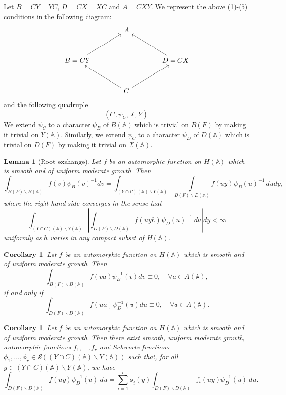 \documentclass[12pt]{amsart}
\newcommand{\A}{\mathbb{A}}
\newtheorem{lemma}[theorem]{Lemma}
\newtheorem{corollary}[theorem]{Corollary}%
\theoremstyle{remark}
\newcommand{\bs}{\backslash}
\begin{document}
Let $B=CY=YC$, $D=CX=XC$ and $A=CXY$. We represent the above (1)-(6) conditions in the following diagram:
\begin{equation}
\label{eq-RootExchange-diagram}
\begin{tikzcd}[row sep=3em, column sep=4em]
& A & \\
B = CY \arrow[ur] & & D = CX \arrow[ul] \\
& C \arrow[ul] \arrow[ur] &
\end{tikzcd}
\end{equation}
and the following quadruple
\begin{equation}
\label{eq-RootExchange-quadruple}
(C, \psi_C, X, Y).
\end{equation}
We extend $\psi_C$ to a character $\psi_B$ of $B(\A)$ which is trivial on $B(F)$ by making it trivial on 
$Y(\A)$. Similarly, we extend $\psi_C$ to a character $\psi_D$ of $D(\A)$ which is trivial on $D(F)$ by making it trivial on $X(\A)$. 

\begin{lemma}[Root exchange] 
\label{lemma-RootExchange}
Let $f$ be an automorphic function on $H(\A)$ which is smooth and of uniform moderate growth. Then
\[
\int_{B(F)\bs B(\A)}f(v)\psi_B(v)^{-1} dv=\int_{(Y\cap C)(\A)\bs Y(\A)}\int\limits_{D(F)\bs D(\A)} f(uy)\psi_D(u)^{-1}\ du dy,
\]
where the right hand side converges in the sense that
\[
\int_{(Y\cap C)(\A)\bs Y(\A)} \left| \int_{D(F)\bs D(\A)}f(uyh)\psi_D(u)^{-1}\ du \right| dy <\infty
\]
uniformly as $h$ varies in any compact subset of $H(\A)$.
\end{lemma}


\begin{corollary}
\label{corollary-RootExchange1}
Let $f$ be an automorphic function on $H(\A)$ which is smooth and of uniform moderate growth. Then
\begin{equation*}
\int_{B(F)\backslash B(\A)} f(va)\psi_B^{-1}(v)dv \equiv 0, \quad \forall a\in A(\A),	
\end{equation*}
if and only if 
\begin{equation*}
\int_{D(F)\backslash D(\A)} f(ua)\psi_D^{-1}(u)du \equiv 0, \quad \forall a\in A(\A).
\end{equation*}
\end{corollary}

\begin{corollary}
\label{corollary-RootExchange2}
Let $f$ be an automorphic function on $H(\A)$ which is smooth and of uniform moderate growth. Then there exist smooth, uniform moderate growth, 
automorphic functions  
$f_1,\dots, f_r$ and Schwartz functions $\phi_1,\dots,\phi_r\in \mathcal S((Y\cap C)(\A) \bs Y(\A))$ such that, for all 
$y\in (Y\cap C)(\A)\bs Y(\A)$, we have
\begin{equation*}
\int_{D(F)\bs D(\A)} f(uy)\psi^{-1}_D(u)\ du=\sum_{i=1}^r \phi_i(y)\int_{D(F)\bs D(\A)} f_i(uy)\psi^{-1}_D(u)\ du.
\end{equation*}
\end{corollary}
\end{document}
